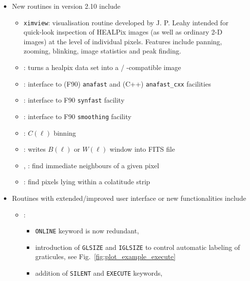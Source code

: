 \documentclass[12pt,twoside]{article}
\begin{document}
{\begin{itemize}
%
\item New routines in version 2.10 include
\begin{itemize} %
 \item {{\tt ximview}}: visualisation routine developed by J. P. Leahy intended for quick-look inspection of HEALPix images 
(as well as ordinary 2-D images) at the level of individual pixels. Features
include panning, zooming, blinking, image statistics and peak finding.
 \item {}: turns a healpix data set into a
%
/%
%
-compatible image
 \item {}: interface to (F90) {\tt anafast}
and (C++) {\tt anafast\_cxx} facilities 
 \item {}: interface to F90 {\tt synfast} facility
 \item {}: interface to F90 {\tt smoothing} facility
 \item {}: $C(\ell)$ binning
 \item {}: writes $B(\ell)$ or $W(\ell)$ window into
FITS file
 \item {}, %
       : %
   find immediate neighbours of a given pixel
 \item {}: %
   find pixels lying within a colatitude strip
\end{itemize} %
%
\item Routines with extended/improved user interface or new functionalities include
 \begin{itemize} %
  \item {}: 
  \begin{itemize} %
   \item {\tt ONLINE} keyword is now redundant, 
   \item introduction of {\tt GLSIZE} and {\tt IGLSIZE} to
  	control automatic labeling of graticules,
	see Fig.~\ref{fig:plot_example_execute}
   \item addition of {\tt SILENT} and {\tt EXECUTE} keywords,

\end{itemize}
\end{itemize}
\end{itemize}}
\end{document}
